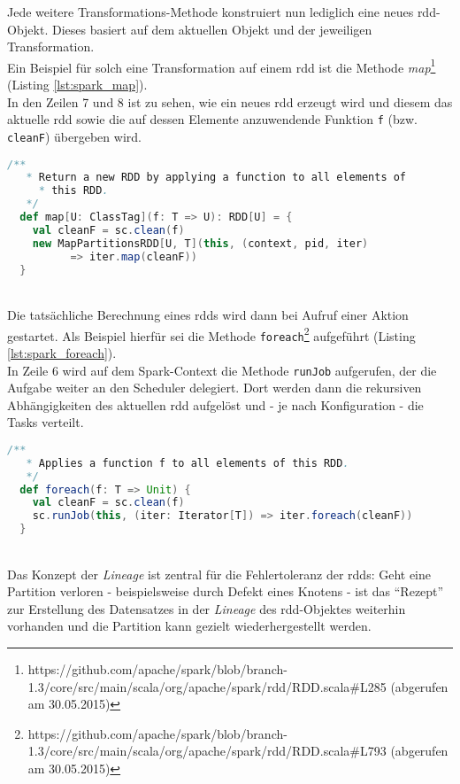 Jede weitere Transformations-Methode konstruiert nun lediglich eine neues \gls{rdd}-Objekt. Dieses basiert auf dem aktuellen Objekt und der jeweiligen Transformation.\\

Ein Beispiel für solch eine Transformation auf einem \gls{rdd} ist die Methode \textit{map}\footnote{https://github.com/apache/spark/blob/branch-1.3/core/src/main/scala/org/apache/spark/rdd/RDD.scala#L285 (abgerufen am 30.05.2015)} (Listing \ref{lst:spark_map}).\\

In den Zeilen 7 und 8 ist zu sehen, wie ein neues \gls{rdd} erzeugt wird und diesem das aktuelle \gls{rdd} sowie die auf dessen Elemente anzuwendende Funktion \lstinline|f| (bzw. \lstinline|cleanF|) übergeben wird.\\

\begin{lstlisting}[language=Scala,caption={Map-Methode aus org.apache.spark.rdd.RDD v1.3.0},label={lst:spark_map}]
  /**
   * Return a new RDD by applying a function to all elements of 
	 * this RDD.
   */
  def map[U: ClassTag](f: T => U): RDD[U] = {
    val cleanF = sc.clean(f)
    new MapPartitionsRDD[U, T](this, (context, pid, iter) 
		  => iter.map(cleanF))
  }
\end{lstlisting}
\\
Die tatsächliche Berechnung eines \glspl{rdd} wird dann bei Aufruf einer Aktion gestartet. Als Beispiel hierfür sei die Methode \lstinline|foreach|\footnote{https://github.com/apache/spark/blob/branch-1.3/core/src/main/scala/org/apache/spark/rdd/RDD.scala#L793 (abgerufen am 30.05.2015)} aufgeführt (Listing \ref{lst:spark_foreach}).\\
In Zeile 6 wird auf dem Spark-Context die Methode \lstinline|runJob| aufgerufen, der die Aufgabe weiter an den Scheduler delegiert. Dort werden dann die rekursiven Abhängigkeiten des aktuellen \gls{rdd} aufgelöst und - je nach Konfiguration - die Tasks verteilt.\\

\begin{lstlisting}[language=Scala,caption={foreach-Methode aus org.apache.spark.rdd.RDD v1.3.0},label={lst:spark_foreach}]
  /**
   * Applies a function f to all elements of this RDD.
   */
  def foreach(f: T => Unit) {
    val cleanF = sc.clean(f)
    sc.runJob(this, (iter: Iterator[T]) => iter.foreach(cleanF))
  }
\end{lstlisting}
\\
Das Konzept der \textit{Lineage} ist zentral für die Fehlertoleranz der \gls{rdd}s:
Geht eine Partition verloren - beispielsweise durch Defekt eines Knotens - ist das "`Rezept"' zur Erstellung des Datensatzes in der \textit{Lineage} des \gls{rdd}-Objektes weiterhin vorhanden und die Partition kann gezielt wiederhergestellt werden.\\

